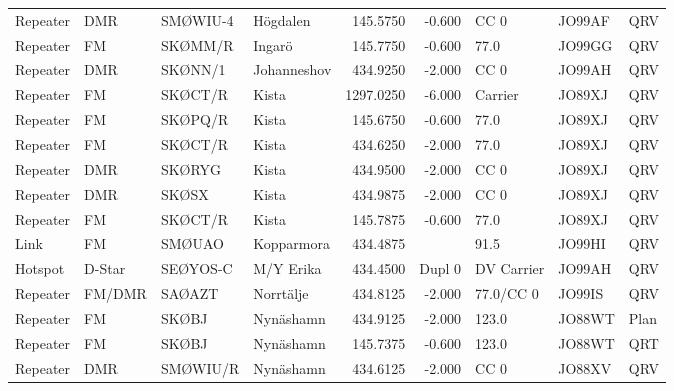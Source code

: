 {\begin{landscape}
\begin{longtable}{llllrrlll}
	Repeater          & DMR                & SMØWIU-4 & Högdalen        &     145.5750 &     -0.600 & CC 0       & JO99AF      & QRV      \\
	Repeater          & FM                 & SKØMM/R  & Ingarö          &     145.7750 &     -0.600 & 77.0       & JO99GG      & QRV      \\
	Repeater          & DMR                & SKØNN/1  & Johanneshov     &     434.9250 &     -2.000 & CC 0       & JO99AH      & QRV      \\
	Repeater          & FM                 & SKØCT/R  & Kista           &    1297.0250 &     -6.000 & Carrier    & JO89XJ      & QRV      \\
	Repeater          & FM                 & SKØPQ/R  & Kista           &     145.6750 &     -0.600 & 77.0       & JO89XJ      & QRV      \\
	Repeater          & FM                 & SKØCT/R  & Kista           &     434.6250 &     -2.000 & 77.0       & JO89XJ      & QRV      \\
	Repeater          & DMR                & SKØRYG   & Kista           &     434.9500 &     -2.000 & CC 0       & JO89XJ      & QRV      \\
	Repeater          & DMR                & SKØSX    & Kista           &     434.9875 &     -2.000 & CC 0       & JO89XJ      & QRV      \\
	Repeater          & FM                 & SKØCT/R  & Kista           &     145.7875 &     -0.600 & 77.0       & JO89XJ      & QRV      \\
	Link              & FM                 & SMØUAO   & Kopparmora      &     434.4875 &            & 91.5       & JO99HI      & QRV      \\
	Hotspot           & D-Star             & SEØYOS-C & M/Y Erika       &     434.4500 &     Dupl 0 & DV Carrier & JO99AH      & QRV      \\
	Repeater          & FM/DMR             & SAØAZT   & Norrtälje       &     434.8125 &     -2.000 & 77.0/CC 0  & JO99IS      & QRV      \\
	Repeater          & FM                 & SKØBJ    & Nynäshamn       &     434.9125 &     -2.000 & 123.0      & JO88WT      & Plan     \\
	Repeater          & FM                 & SKØBJ    & Nynäshamn       &     145.7375 &     -0.600 & 123.0      & JO88WT      & QRT      \\
	Repeater          & DMR                & SMØWIU/R & Nynäshamn       &     434.6125 &     -2.000 & CC 0       & JO88XV      & QRV      \\

\end{longtable}
\end{landscape}}
